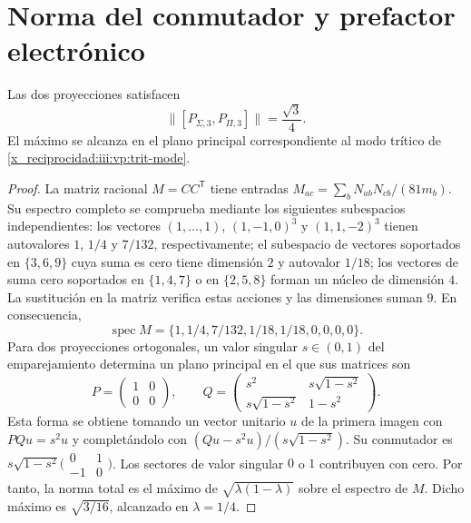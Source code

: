 \section{Norma del conmutador y prefactor electrónico}

\begin{theorem}
Las dos proyecciones satisfacen
\begin{equation}
 \bigl\|[P_{\Sigma,3},P_{\Pi,3}]\bigr\|=\frac{\sqrt3}{4}.
 \label{x_reciprocidad:iii:vp:prefactor}
\end{equation}
El máximo se alcanza en el plano principal correspondiente al modo
trítico de \eqref{x_reciprocidad:iii:vp:trit-mode}.
\end{theorem}
\begin{proof}
La matriz racional $M=CC^{\mathsf T}$ tiene entradas
$M_{ac}=\sum_bN_{ab}N_{cb}/(81m_b)$. Su espectro completo se
comprueba mediante los siguientes subespacios independientes: los
vectores $(1,\ldots,1)$, $(1,-1,0)^3$ y $(1,1,-2)^3$ tienen
autovalores $1$, $1/4$ y $7/132$, respectivamente; el subespacio de
vectores soportados en $\{3,6,9\}$ cuya suma es cero tiene dimensión
$2$ y autovalor $1/18$; los vectores de suma cero soportados en
$\{1,4,7\}$ o en $\{2,5,8\}$ forman un núcleo de dimensión $4$.
La sustitución en la matriz verifica estas acciones y las dimensiones
suman $9$. En consecuencia,
\[
 \operatorname{spec}M=
 \{1,1/4,7/132,1/18,1/18,0,0,0,0\}.
\]
Para dos proyecciones ortogonales, un valor singular $s\in(0,1)$ del
emparejamiento determina un plano principal en el que sus matrices son
\[
 P=\begin{pmatrix}1&0\\0&0\end{pmatrix},\qquad
 Q=\begin{pmatrix}s^2&s\sqrt{1-s^2}\\
 s\sqrt{1-s^2}&1-s^2\end{pmatrix}.
\]
Esta forma se obtiene tomando un vector unitario $u$ de la primera
imagen con $PQu=s^2u$ y completándolo con
$(Qu-s^2u)/(s\sqrt{1-s^2})$. Su conmutador es
$s\sqrt{1-s^2}\bigl(\begin{smallmatrix}0&1\\-1&0\end{smallmatrix}\bigr)$.
Los sectores de valor singular $0$ o $1$ contribuyen con cero.
Por tanto, la norma total es el máximo de
$\sqrt{\lambda(1-\lambda)}$ sobre el espectro de $M$. Dicho máximo
es $\sqrt{3/16}$, alcanzado en $\lambda=1/4$.
\end{proof}

